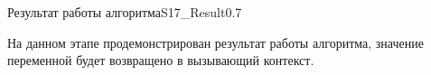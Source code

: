 \begin{itemize}
\begin{algostep}{Результат работы алгоритма}{S17_Result}{0.7}
 
  На данном этапе продемонстрирован результат работы алгоритма,
  значение переменной  будет возвращено в вызывающий
  контекст.
\end{algostep}
\end{itemize}

